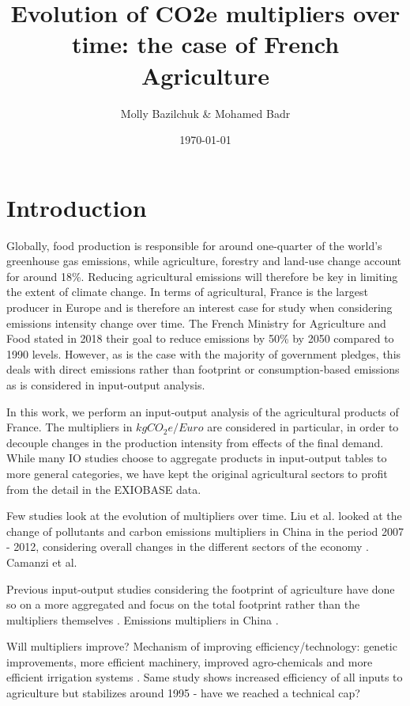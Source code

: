 \documentclass[a4paper,twoside]{article}
\title{Evolution of CO2e multipliers over time: the case of French Agriculture}
\author{Molly Bazilchuk & Mohamed Badr}
\date{\today}
\begin{document}
\maketitle
\vspace{3cm}


\section{Introduction}

Globally, food production is responsible for around one-quarter of the world's greenhouse gas emissions, while agriculture, forestry and land-use change account for around 18\%. Reducing agricultural emissions will therefore be key in limiting the extent of climate change. In terms of agricultural, France is the largest producer in Europe and is therefore an interest case for study when considering emissions intensity change over time. The French Ministry for Agriculture and Food stated in 2018 their goal to reduce emissions by 50\% by 2050 compared to 1990 levels. However, as is the case with the majority of government pledges, this deals with direct emissions rather than footprint or consumption-based emissions as is considered in input-output analysis. 

In this work, we perform an input-output analysis of the agricultural products of France. The multipliers in $kgCO_2e/Euro$ are considered in particular, in order to decouple changes in the production intensity from effects of the final demand. While many IO studies choose to aggregate products in input-output tables to more general categories, we have kept the original agricultural sectors to profit from the detail in the EXIOBASE data.

Few studies look at the evolution of multipliers over time. Liu et al. \cite{Liu2017} looked at the change of pollutants and carbon emissions multipliers in China in the period 2007 - 2012, considering overall changes in the different sectors of the economy  \cite{Liu2017} . Camanzi et al. 

Previous input-output studies considering the footprint of agriculture have done so on a more aggregated  and focus on the total footprint rather than the multipliers themselves \cite{Camanzi2017}. Emissions multipliers in China \cite{Liu2017}.

Will multipliers improve? Mechanism of improving efficiency/technology: genetic improvements, more efficient machinery, improved agro-chemicals and more efficient irrigation systems \cite{Schneider2009}. Same study shows increased efficiency of all inputs to agriculture but stabilizes around 1995 - have we reached a technical cap?
\end{document}
